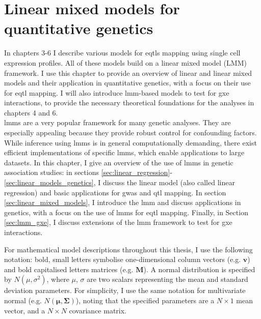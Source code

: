 
\chapter{Linear mixed models for quantitative genetics}
\label{chapter2}

In chapters 3-6 I describe various models for \glspl{eqtl} mapping using single cell expression profiles. 
All of these models build on a linear mixed model (LMM) framework. 
I use this chapter to provide an overview of linear and linear mixed models and their application in quantitative genetics, with a focus on their use for \gls{eqtl} mapping. 
I will also introduce \gls{lmm}-based models to test for \gls{gxe} interactions, to provide the necessary theoretical foundations for the analyses in chapters 4 and 6.\\

\gls{lmm}s are a very popular framework for many genetic analyses. 
They are especially appealing because they provide robust control for confounding factors. 
While inference using \gls{lmm}s is in general computationally demanding, there exist efficient implementations of specific \gls{lmm}s, which enable applications to large datasets. 
In this chapter, I give an overview of the use of \gls{lmm}s in genetic association studies: in sections \ref{sec:linear_regression}-\ref{sec:linear_models_genetics}, I discuss the linear model (also called linear regression) and basic applications for \gls{gwas} and \gls{qtl} mapping. 
In section \ref{sec:linear_mixed_models}, I introduce the \gls{lmm} and discuss applications in genetics, with a focus on the use of \gls{lmm}s for \gls{eqtl} mapping. 
Finally, in Section \ref{sec:lmm_gxe}, I discuss extensions of the \gls{lmm} framework to test for \gls{gxe} interactions.\\

\newpage

For mathematical model descriptions throughout this thesis, I use the following notation: bold, small letters symbolise one-dimensional column vectors (e.g. $\mathbf{v}$) and bold capitalised letters matrices (e.g. $\mathbf{M}$). 
A normal distribution is specified by $ N(\mu, \sigma^2)$, where $\mu$, $\sigma$ are two scalars representing the mean and standard deviation parameters.
For simplicity, I use the same notation for multivariate normal (e.g. $ N(\boldsymbol{\mu}, \boldsymbol{\Sigma})$), noting that the specified parameters are a $N \times 1$ mean vector, and a $N \times N$ covariance matrix.

